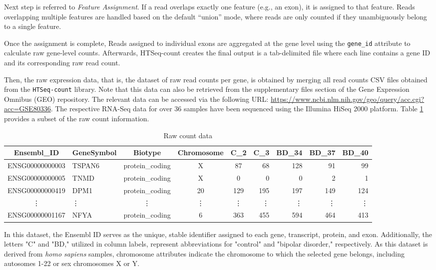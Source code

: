 \documentclass{article}
\begin{document}
Next step is referred to \emph{Feature Assignment}. If a read overlaps exactly one feature (e.g., an exon), it is assigned to that feature. Reads overlapping multiple features are handled based on the default “union” mode, where reads are only counted if they unambiguously belong to a single feature. 

Once the assignment is complete, Reads assigned to individual exons are aggregated at the gene level using the \texttt{gene\_id} attribute to calculate raw gene-level counts. Afterwards, HTSeq-count creates the final output is a tab-delimited file where each line contains a gene ID and its corresponding raw read count.

Then, the raw expression data, that is, the dataset of raw read counts per gene, is obtained by merging all read counts CSV files obtained from the \texttt{HTSeq-count} library. Note that this data can also be retrieved from the supplementary files section of the Gene Expression Omnibus (GEO) repository. The relevant data can be accessed via the following URL: \url{https://www.ncbi.nlm.nih.gov/geo/query/acc.cgi?acc=GSE80336}. The respective RNA-Seq data for over 36 samples have been sequenced using the Illumina HiSeq 2000 platform. Table \ref{table:countdata_info} provides a subset of the raw count information.
\begin{table}[H]
\centering
\begin{tabular}{clcccrrrr}
\toprule
Ensembl\_ID & GeneSymbol & Biotype & Chromosome & C\_2 & C\_3 & BD\_34 & BD\_37 & BD\_40 \\
\midrule
ENSG00000000003 & TSPAN6 & protein\_coding & X & 87 & 68 & 128 & 91 & 99 \\
ENSG00000000005 & TNMD & protein\_coding & X & 0 & 0 & 0 & 2 & 1 \\
ENSG00000000419 & DPM1 & protein\_coding & 20 & 129 & 195 & 197 & 149 & 124 \\
\vdots & \vdots & \vdots & \vdots & \vdots & \vdots & \vdots & \vdots & \vdots \\
ENSG00000001167 & NFYA & protein\_coding & 6 & 363 & 455 & 594 & 464 & 413 \\
\bottomrule
\end{tabular}
\caption{Raw count data}
\label{table:countdata_info}
\end{table}
In this dataset, the Ensembl ID serves as the unique, stable identifier assigned to each gene, transcript, protein, and exon. Additionally, the letters "C" and "BD," utilized in column labels, represent abbreviations for "control" and "bipolar disorder," respectively. As this dataset is derived from \emph{homo sapiens} samples, chromosome attributes indicate the chromosome to which the selected gene belongs, including autosomes 1-22 or sex chromosomes X or Y.
\end{document}
